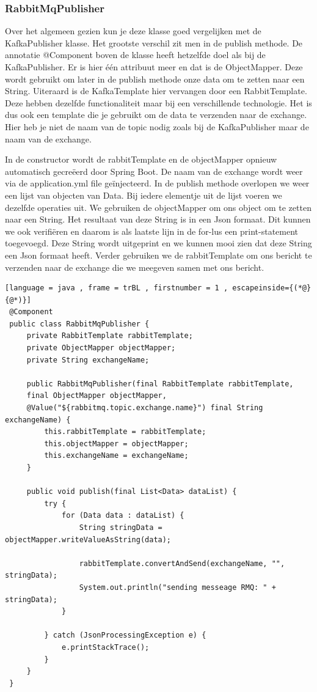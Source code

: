  \subsubsection{RabbitMqPublisher}
 Over het algemeen gezien kun je deze klasse goed vergelijken met de KafkaPublisher klasse. Het grootste verschil zit men in de publish methode. De annotatie @Component boven de klasse heeft hetzelfde doel als bij de KafkaPublisher. Er is hier één attribuut meer en dat is de ObjectMapper. Deze wordt gebruikt om later in de publish methode onze data om te zetten naar een String. Uiteraard is de KafkaTemplate hier vervangen door een RabbitTemplate. Deze hebben dezelfde functionaliteit maar bij een verschillende technologie. Het is dus ook een template die je gebruikt om de data te verzenden naar de exchange. Hier heb je niet de naam van de topic nodig zoals bij de KafkaPublisher maar de naam van de exchange.
 
 In de constructor wordt de rabbitTemplate en de objectMapper opnieuw automatisch gecreëerd door Spring Boot. De naam van de exchange wordt weer via de application.yml file geïnjecteerd. In de publish methode overlopen we weer een lijst van objecten van Data. Bij iedere elementje uit de lijst voeren we dezelfde operaties uit. We gebruiken de objectMapper om ons object om te zetten naar een String. Het resultaat van deze String is in een Json formaat. Dit kunnen we ook verifiëren en daarom is als laatste lijn in de for-lus een print-statement toegevoegd. Deze String wordt uitgeprint en we kunnen mooi zien dat deze String een Json formaat heeft. Verder gebruiken we de rabbitTemplate om ons bericht te verzenden naar de exchange die we meegeven samen met ons bericht.
   \begin{lstlisting}[language = java , frame = trBL , firstnumber = 1 , escapeinside={(*@}{@*)}]
 @Component
 public class RabbitMqPublisher {
     private RabbitTemplate rabbitTemplate;
     private ObjectMapper objectMapper;
     private String exchangeName;
     
     public RabbitMqPublisher(final RabbitTemplate rabbitTemplate,
     final ObjectMapper objectMapper,
     @Value("${rabbitmq.topic.exchange.name}") final String exchangeName) {
         this.rabbitTemplate = rabbitTemplate;
         this.objectMapper = objectMapper;
         this.exchangeName = exchangeName;
     }
     
     public void publish(final List<Data> dataList) {
         try {
             for (Data data : dataList) {
                 String stringData = objectMapper.writeValueAsString(data);
                 
                 rabbitTemplate.convertAndSend(exchangeName, "", stringData);
                 System.out.println("sending messeage RMQ: " + stringData);
             }
             
         } catch (JsonProcessingException e) {
             e.printStackTrace();
         }
     }
 }
     \end{lstlisting}

